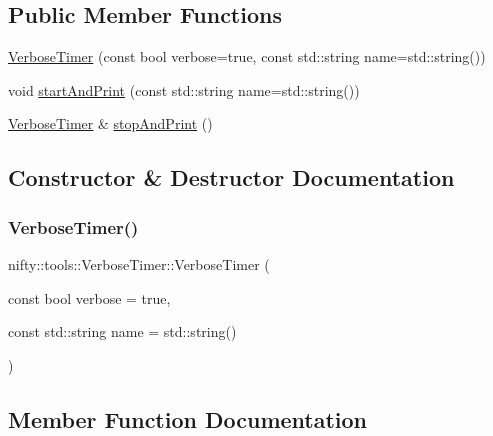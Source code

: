 \subsection*{Public Member Functions}
\begin{DoxyCompactItemize}
\item 
\hyperlink{classnifty_1_1tools_1_1VerboseTimer_af97750a677d97f624e9149a4af40d168}{Verbose\+Timer} (const bool verbose=true, const std\+::string name=std\+::string())
\item 
void \hyperlink{classnifty_1_1tools_1_1VerboseTimer_aedbd04630e3c9082d46e83171d608e1f}{start\+And\+Print} (const std\+::string name=std\+::string())
\item 
\hyperlink{classnifty_1_1tools_1_1VerboseTimer}{Verbose\+Timer} \& \hyperlink{classnifty_1_1tools_1_1VerboseTimer_a6a56ecb0e21a8407b14620fd91a2d492}{stop\+And\+Print} ()
\end{DoxyCompactItemize}


\subsection{Constructor \& Destructor Documentation}
\mbox{\label{classnifty_1_1tools_1_1VerboseTimer_af97750a677d97f624e9149a4af40d168}} 
\subsubsection{\texorpdfstring{Verbose\+Timer()}{VerboseTimer()}}
{\footnotesize\ttfamily nifty\+::tools\+::\+Verbose\+Timer\+::\+Verbose\+Timer (\begin{DoxyParamCaption}\item[{const bool}]{verbose = {\ttfamily true},  }\item[{const std\+::string}]{name = {\ttfamily std\+:\+:string()} }\end{DoxyParamCaption})\hspace{0.3cm}{\ttfamily [inline]}}



\subsection{Member Function Documentation}
\mbox{\label{classnifty_1_1tools_1_1VerboseTimer_aedbd04630e3c9082d46e83171d608e1f}} 
